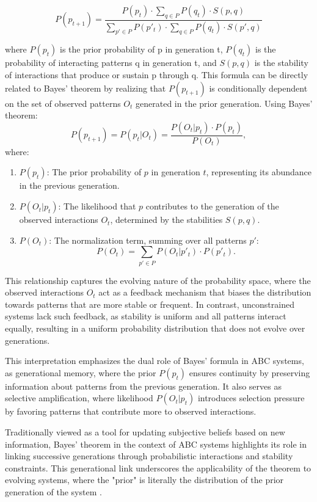 \documentclass[entropy,article,submit,pdftex,oneauthor]{Definitions/mdpi}
\begin{document}
\begin{equation}
P(p_{t+1}) = \frac{P(p_t) \cdot \sum_{q \in P} P(q_t) \cdot S(p, q)}{\sum_{p' \in P} P(p'_t) \cdot \sum_{q \in P} P(q_t) \cdot S(p', q)}
\label{eq:bayes}
\end{equation}

where \( P(p_t) \) is the prior probability of p in generation t, \( P(q_t) \) is the probability of interacting patterns q in generation t, and \( S(p, q) \) is the stability of interactions that produce or sustain p through q. This formula can be directly related to Bayes' theorem by realizing that \( P(p_{t+1}) \) is conditionally dependent on the set of observed patterns \( O_t \) generated in the prior generation. Using Bayes' theorem:
\begin{equation}
P(p_{t+1}) = P(p_t | O_t) = \frac{P(O_t | p_t) \cdot P(p_t)}{P(O_t)},
\end{equation}
where:
\begin{enumerate}
    \item[] \( P(p_t) \): The prior probability of \( p \) in generation \( t \), representing its abundance in the previous generation.
    \item[] \( P(O_t | p_t) \): The likelihood that \( p \) contributes to the generation of the observed interactions \( O_t \), determined by the stabilities \( S(p, q) \).
    \item[] \( P(O_t) \): The normalization term, summing over all patterns \( p' \):
    \[
    P(O_t) = \sum_{p' \in P} P(O_t | p'_t) \cdot P(p'_t).
    \]
\end{enumerate}

This relationship captures the evolving nature of the probability space, where the observed interactions \( O_t \) act as a feedback mechanism that biases the distribution towards patterns that are more stable or frequent. In contrast, unconstrained systems lack such feedback, as stability is uniform and all patterns interact equally, resulting in a uniform probability distribution that does not evolve over generations. 

This interpretation emphasizes the dual role of Bayes' formula in ABC systems, as generational memory, where the prior \( P(p_t) \) ensures continuity by preserving information about patterns from the previous generation.
It also serves as selective amplification, where likelihood \( P(O_t | p_t) \) introduces selection pressure by favoring patterns that contribute more to observed interactions. 

Traditionally viewed as a tool for updating subjective beliefs based on new information, Bayes’ theorem in the context of ABC systems highlights its role in linking successive generations through probabilistic interactions and stability constraints. This generational link underscores the applicability of the theorem to evolving systems, where the "prior" is literally the distribution of the prior generation of the system \cite{le2020equation}.
\end{document}
